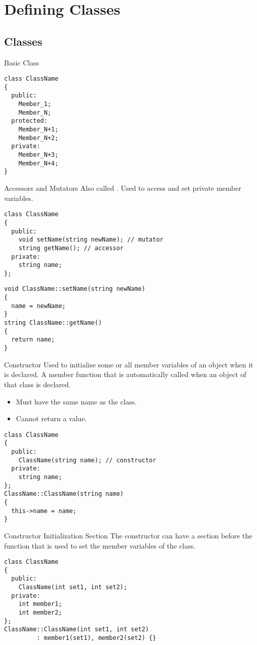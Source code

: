 \documentclass[\main/notes.tex]{subfiles}
\begin{document}
	\setcounter{chapter}{4}
	\chapter{Defining Classes}
		\section{Classes}
			\begin{codebox}{Basic Class}
				\begin{verbatim}
class ClassName
{
  public:
    Member_1;
    Member_N;
  protected:
    Member_N+1;
    Member_N+2;
  private:
    Member_N+3;
    Member_N+4;
}
				\end{verbatim}
			\end{codebox}
			\begin{definition}{Accessors and Mutators}
				Also called . Used to access and set private member variables.
				\begin{verbatim}
class ClassName
{
  public:
    void setName(string newName); // mutator
    string getName(); // accessor
  private:
    string name;
};
				\end{verbatim}
				\pagebreak
				\begin{verbatim}
void ClassName::setName(string newName)
{
  name = newName;
}
string ClassName::getName()
{
  return name;
}
				\end{verbatim}
			\end{definition}
			\begin{definition}{Constructor}
				Used to initialise some or all member variables of an object when it is declared. A member function that is automatically called when an object of that class is declared.
				\begin{itemize}[nosep]
					\item Must have the same name as the class.
					\item Cannot return a value.
				\end{itemize}
				\begin{verbatim}
class ClassName
{
  public:
    ClassName(string name); // constructor
  private:
    string name;
};
ClassName::ClassName(string name)
{
  this->name = name;
}
				\end{verbatim}
			\end{definition}
			\begin{sidenote}{Constructor Initialization Section}
				The constructor can have a section before the function that is used to set the member variables of the class.
				\begin{verbatim}
class ClassName
{
  public:
    ClassName(int set1, int set2);
  private:
    int member1;
    int member2;
};
ClassName::ClassName(int set1, int set2)
         : member1(set1), member2(set2) {}
				\end{verbatim}
			\end{sidenote}
\end{document}
